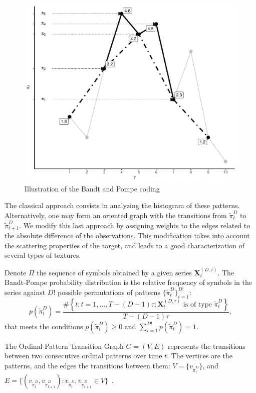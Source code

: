 \documentclass{isprs}
\begin{document}
\begin{figure}[hbt]
	\centering
	\includegraphics[width=.9\linewidth]{../../Figures/IntroBP.pdf}
	\caption{Illustration of the Bandt and Pompe coding\label{Fig:IntroBP}}
\end{figure}

The classical approach consists in analyzing the histogram of these patterns.
Alternatively, one may form an oriented graph with the transitions from $\widetilde\pi_t^D$ to $\widetilde\pi_{t+1}^D$.
We modify this last approach by assigning weights to the edges related to the absolute difference of the observations.
This modification takes into account the scattering properties of the target, and leads to a good characterization of several types of textures.

Denote $\Pi$ the sequence of symbols obtained by a given series $\mathbf{X}_t^{(D,\tau)}$.
The Bandt-Pompe probability distribution is the relative frequency of symbols in the series against $D!$ possible permutations of patterns $\{\widetilde\pi_t^D \}_{t = 1}^{D!}$:
\begin{equation}
p(\widetilde\pi_t^D) = \frac{\#\left \{t : t = 1, \dots, T-(D-1)\tau; \mathbf{X}_t^{(D,\tau)} \text{ is of type } \widetilde\pi_t^D\right \}}{T- (D-1)\tau},  
\end{equation}
that meets the conditions $p(\widetilde\pi_t^D) \ge 0$ and  $\sum_{i=1}^{D!} p(\widetilde\pi_t^D) = 1$.

The Ordinal Pattern Transition Graph ${G} = ({V}, {E})$ 
represents the transitions between two consecutive ordinal patterns over time $t$.
The vertices are the patterns, and the edges the transitions between them:
$V = \{v_{\widetilde\pi_t^D}\}$, and 
$E = \{(v_{\widetilde\pi_t^D}, v_{\widetilde\pi_{t+1}^D}): v_{\widetilde\pi_t^D}, v_{\widetilde\pi_{t+1}^D} \in V \}$~\cite{LearningandDistinguishingTimeSeriesDynamicsViaOrdinalPatternsTransitionGraphs2019}.
\end{document}
